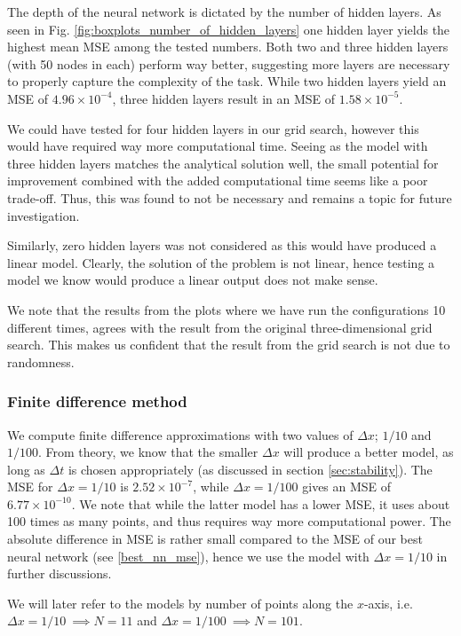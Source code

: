 The depth of the neural network is dictated by the number of hidden layers.
As seen in Fig. \ref{fig:boxplots_number_of_hidden_layers} one hidden layer yields the highest mean MSE among the tested numbers. 
Both two and three hidden layers (with 50 nodes in each) perform way better, suggesting more layers are necessary to properly capture the complexity of the task. 
While two hidden layers yield an MSE of $4.96 \times 10^{-4}$, three hidden layers result in an MSE of $1.58 \times 10^{-5}$.

We could have tested for four hidden layers in our grid search, however this would have required way more computational time.
Seeing as the model with three hidden layers matches the analytical solution well, the small potential for improvement combined with the added computational time seems like a poor trade-off. 
Thus, this was found to not be necessary and remains a topic for future investigation.

Similarly, zero hidden layers was not considered as this would have produced a linear model.
Clearly, the solution of the problem is not linear, hence testing a model we know would produce a linear output does not make sense.

We note that the results from the plots where we have run the configurations 10 different times, agrees with the result from the original three-dimensional grid search.
This makes us confident that the result from the grid search is not due to randomness.

\subsubsection{Finite difference method}

We compute finite difference approximations with two values of $\Delta x$; $1/10$ and $1/100$.
From theory, we know that the smaller $\Delta x$ will produce a better model, as long as $\Delta t$ is chosen appropriately (as discussed in section \ref{sec:stability}).
The MSE for $\Delta x = 1/10$ is $2.52\times 10^{-7}$, while $\Delta x = 1/100$ gives an MSE of $6.77\times 10^{-10}$.
We note that while the latter model has a lower MSE, it uses about 100 times as many points, and thus requires way more computational power.
The absolute difference in MSE is rather small compared to the MSE of our best neural network (see \ref{best_nn_mse}), hence we use the model with $\Delta x = 1/10$ in further discussions.

We will later refer to the models by number of points along the $x$-axis, i.e. $\Delta x = 1/10 \ \implies N = 11$ and $\Delta x = 1/100 \ \implies N = 101$.

